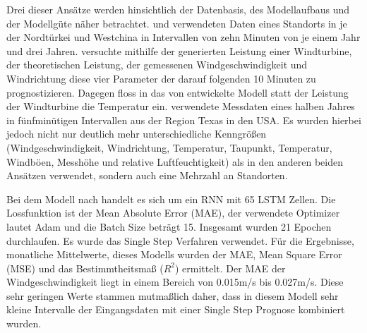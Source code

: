 \documentclass[
12pt, %
toc=listofnumbered, %
toc=chapterentrydotfill, %
numbers=noenddot, %
captions=tableheading, %
bibliography=numbered
]{scrreprt}
\begin{document}
Drei dieser Ansätze werden hinsichtlich der Datenbasis, des Modellaufbaus und der Modellgüte näher betrachtet. \citeauthor{2020_Delgado_WindTurbineData} \cite{2020_Delgado_WindTurbineData} und 
\citeauthor{2018_Yao_MultidimensionalLSTMNetworks} \cite{2018_Yao_MultidimensionalLSTMNetworks} verwendeten Daten eines Standorts in je der Nordtürkei und Westchina in Intervallen von 
zehn Minuten von je einem Jahr und drei Jahren. \citeauthor{2020_Delgado_WindTurbineData} versuchte mithilfe der generierten Leistung einer Windturbine, der theoretischen Leistung,  
der gemessenen Windgeschwindigkeit und Windrichtung diese vier Parameter der darauf folgenden 10 Minuten zu prognostizieren. Dagegen floss in 
das von \citeauthor{2018_Yao_MultidimensionalLSTMNetworks} entwickelte Modell statt der Leistung der Windturbine die Temperatur ein. \citeauthor{2019_Chen_MultifactorSpatiotemporalCorrelation} 
\cite{2019_Chen_MultifactorSpatiotemporalCorrelation} verwendete Messdaten eines halben Jahres in fünfminütigen Intervallen aus der Region Texas in den USA. 
Es wurden hierbei jedoch nicht nur deutlich mehr unterschiedliche Kenngrößen (Windgeschwindigkeit, Windrichtung, Temperatur, Taupunkt, Temperatur, Windböen, Messhöhe und relative Luftfeuchtigkeit) 
als in den anderen beiden Ansätzen verwendet, sondern auch eine Mehrzahl an Standorten.

Bei dem Modell nach \citeauthor{2020_Delgado_WindTurbineData} handelt es sich um ein RNN mit 65 LSTM Zellen. Die Lossfunktion ist der Mean Absolute Error (MAE), der 
verwendete Optimizer lautet Adam und die Batch Size beträgt 15. Insgesamt wurden 21 Epochen durchlaufen. Es wurde das Single Step Verfahren verwendet. Für die Ergebnisse, monatliche Mittelwerte, dieses Modells wurden der MAE, 
Mean Square Error (MSE) und das Bestimmtheitsmaß ($R^2$) ermittelt. Der MAE der Windgeschwindigkeit liegt in einem Bereich von 0.015m/s bis 0.027m/s. Diese sehr geringen Werte stammen 
mutmaßlich daher, dass in diesem Modell sehr kleine Intervalle der Eingangsdaten mit einer Single Step Prognose kombiniert wurden. 
\end{document}
